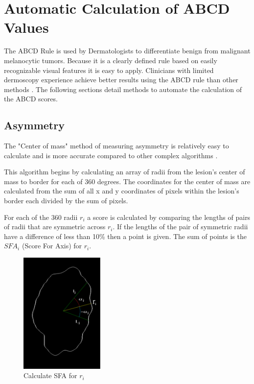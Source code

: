 \section{Automatic Calculation of ABCD Values}

The ABCD Rule is used by Dermatologists to differentiate benign from malignant melanocytic tumors. Because it is a clearly defined rule based on easily recognizable visual features it is easy to apply. Clinicians with limited dermoscopy experience achieve better results using the ABCD rule than other methods \cite{Weigert_2012}. The following sections detail methods to automate the calculation of the ABCD scores.

\subsection{Asymmetry}

The "Center of mass" method of measuring asymmetry is relatively easy to calculate and is more accurate compared to other complex algorithms \cite{Premaladha_2014}.

This algorithm begins by calculating an array of radii from the lesion's center of mass to border for each of 360 degrees. The coordinates for the center of mass are calculated from the sum of all x and y coordinates of pixels within the lesion's border each divided by the sum of pixels.

For each of the 360 radii $r_i$ a score is calculated by comparing the lengths of pairs of radii that are symmetric across $r_i$. If the lengths of the pair of symmetric radii have a difference of less than 10\% then a point is given. The sum of points is the $SFA_i$ (Score For Axis) for $r_i$.

\begin{figure}[H]
    \centering
    \includegraphics[height=6cm,keepaspectratio]{assets/assymertry/asymmetry_01.pdf}
    \caption{Calculate SFA for $r_i$}
    \label{fig:sfa}
\end{figure}


